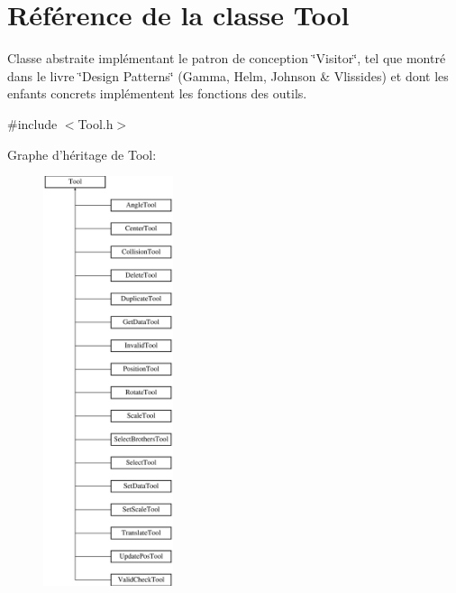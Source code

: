 \hypertarget{class_tool}{\section{Référence de la classe Tool}
\label{class_tool}
}


Classe abstraite implémentant le patron de conception \char`\"{}\-Visitor\char`\"{}, tel que montré dans le livre \char`\"{}\-Design Patterns\char`\"{} (Gamma, Helm, Johnson \& Vlissides) et dont les enfants concrets implémentent les fonctions des outils.  




{\ttfamily \#include $<$Tool.\-h$>$}

Graphe d'héritage de Tool\-:\begin{figure}[H]
\begin{center}
\leavevmode
\includegraphics[height=12.000000cm]{class_tool}
\end{center}
\end{figure}
